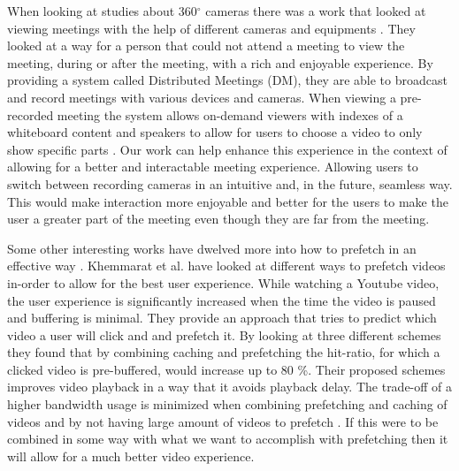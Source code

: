 When looking at studies about 360$^{\circ}$ cameras there was a work that looked at viewing meetings with the help of different cameras and equipments \cite{distributedmeetings}. They looked at a way for a person that could not attend a meeting to view the meeting, during or after the meeting, with a rich and enjoyable experience. By providing a system called Distributed Meetings (DM), they are able to broadcast and record meetings with various devices and cameras. When viewing a pre-recorded meeting the system allows on-demand viewers with indexes of a whiteboard content and speakers to allow for users to choose a video to only show specific parts \cite{distributedmeetings}. Our work can help enhance this experience in the context of allowing for a better and interactable meeting experience. Allowing users to switch between recording cameras in an intuitive and, in the future, seamless way. This would make interaction more enjoyable and better for the users to make the user a greater part of the meeting even though they are far from the meeting.

Some other interesting works have dwelved more into how to prefetch in an effective way \cite{watchingprefetching, tvservices}. Khemmarat et al. \cite{watchingprefetching} have looked at different ways to prefetch videos in-order to allow for the best user experience. While watching a Youtube video, the user experience is significantly increased when the time the video is paused and buffering is minimal. They provide an approach that tries to predict which video a user will click and and prefetch it. By looking at three different schemes they found that by combining caching and prefetching the hit-ratio, for which a clicked video is pre-buffered, would increase up to 80 \%. Their proposed schemes improves video playback in a way that it avoids playback delay. The trade-off of a higher bandwidth usage is minimized when combining prefetching and caching of videos \cite{watchingprefetching, tvservices} and by not having large amount of videos to prefetch \cite{watchingprefetching}. If this were to be combined in some way with what we want to accomplish with prefetching then it will allow for a much better video experience.
